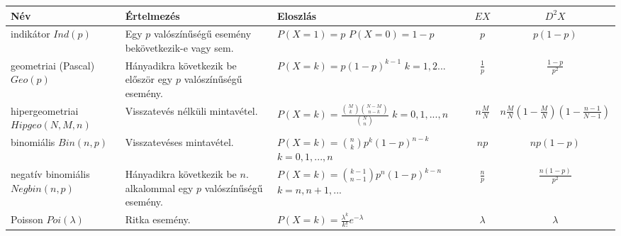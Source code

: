 \documentclass[margin=0px]{article}
\begin{document}
\begin{tabular}{|p{2.5cm}|p{4cm}|p{4cm}|c|c|}
    \hline \textbf{Név}                              & \textbf{Értelmezés}                                                     & \textbf{Eloszlás}                                                                      & \textbf{$EX$}   & \textbf{$D^{2}X$}                                     \\
    \hline indikátor \newline $Ind(p)$               & Egy $p$ valószínűségű esemény bekövetkezik-e vagy sem.                  & $P(X=1) = p$ \newline $P(X=0) = 1-p$                                                   & $p$             & $p(1-p)$                                              \\
    \hline geometriai (Pascal) \newline $Geo(p)$     & Hányadikra következik be először egy $p$ valószínűségű esemény.         & $P(X=k) = p(1-p)^{k-1}$ \newline $k=1,2...$                                            & $\frac{1}{p}$   & $\frac{1-p}{p^2}$                                     \\
    \hline hipergeometriai \newline $Hipgeo(N,M,n)$  & Visszatevés nélküli mintavétel.                                         & $P(X=k) = \frac{{M \choose k}{N-M \choose n-k}}{{N \choose n}}$ \newline $k=0,1,...,n$ & $n \frac{M}{N}$ & $n \frac{M}{N}(1 - \frac{M}{N})(1 - \frac{n-1}{N-1})$ \\
    \hline binomiális \newline $Bin(n,p)$            & Visszatevéses mintavétel.                                               & $P(X=k) = {n \choose k}p^{k}(1-p)^{n-k}$ \newline $k=0,1,...,n$                        & $np$            & $np(1-p)$                                             \\
    \hline negatív binomiális \newline $Negbin(n,p)$ & Hányadikra következik be $n.$ alkalommal egy $p$ valószínűségű esemény. & $P(X=k) = {k-1 \choose n-1}p^{n}(1-p)^{k-n}$ \newline $k=n,n+1,...$                    & $\frac{n}{p}$   & $\frac{n(1-p)}{p^{2}}$                                \\
    \hline Poisson \newline $Poi(\lambda)$           & Ritka esemény.                                                          & $P(X=k) = \frac{\lambda^k}{k!}e^{-\lambda}$                                            & $\lambda$       & $\lambda$                                             \\
    \hline
\end{tabular}
\end{document}
